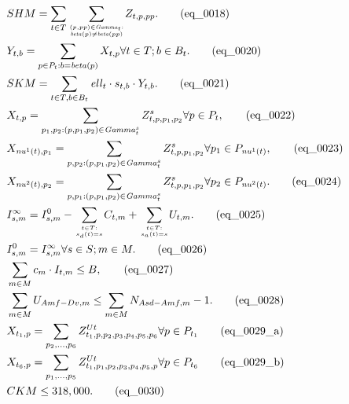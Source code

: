 \begin{align}
  & SHM = \sum_{t \in T} \underset{\genfrac{}{}{0pt}{}{\left(p , pp\right) \in \mathit{Gamma}_{t} :}{\mathit{beta} \left(p\right) \neq \mathit{beta} \left(pp\right)}}{\sum} Z_{t , p , pp} . \tag{eq\_0018} \\
  & Y_{t , b} = \sum_{p \in P_{t} : b = \mathit{beta} \left(p\right)} X_{t , p} \forall t \in T ; b \in B_{t} . \tag{eq\_0020} \\
  & SKM = \sum_{t \in T, b \in B_{t}} \mathit{ell}_{t} \cdot s_{t , b} \cdot Y_{t , b} . \tag{eq\_0021} \\
  & X_{t , p} = \sum_{p_{1} , p_{2} : \left(p , p_{1} , p_{2}\right) \in \mathit{Gamma}_{t}^{s}} Z_{t , p , p_{1} , p_{2}}^{s} \forall p \in P_{t} , \tag{eq\_0022} \\
  & X_{\mathit{nu}^{1} \left(t\right) , p_{1}} = \sum_{p , p_{2} : \left(p , p_{1} , p_{2}\right) \in \mathit{Gamma}_{t}^{s}} Z_{t , p , p_{1} , p_{2}}^{s} \forall p_{1} \in P_{\mathit{nu}^{1} \left(t\right)} , \tag{eq\_0023} \\
  & X_{\mathit{nu}^{2} \left(t\right) , p_{2}} = \sum_{p , p_{1} : \left(p , p_{1} , p_{2}\right) \in \mathit{Gamma}_{t}^{s}} Z_{t , p , p_{1} , p_{2}}^{s} \forall p_{2} \in P_{\mathit{nu}^{2} \left(t\right)} . \tag{eq\_0024} \\
  & I_{s , m}^{\infty} = I_{s , m}^{0} - \underset{\genfrac{}{}{0pt}{}{t \in T :}{s_{d} \left(t\right) = s}}{\sum} C_{t , m} + \underset{\genfrac{}{}{0pt}{}{t \in T :}{s_{a} \left(t\right) = s}}{\sum} U_{t , m} . \tag{eq\_0025} \\
  & I_{s , m}^{0} = I_{s , m}^{\infty} \forall s \in S ; m \in M . \tag{eq\_0026} \\
  & \sum_{m \in M} c_{m} \cdot I_{t , m} \leq B , \tag{eq\_0027} \\
  & \sum_{m \in M} U_{Amf - Dv , m} \leq \sum_{m \in M} N_{Asd - Amf , m} - 1 . \tag{eq\_0028} \\
  & X_{t_1,p} = \sum_{p_2,\ldots,p_6} Z_{t_1,p,p_2,p_3,p_4,p_5,p_6}^{Ut} \forall p \in P_{t_1} \tag{eq\_0029\_a} \\
  & X_{t_6,p} = \sum_{p_1,\ldots,p_5} Z_{t_1,p_1,p_2,p_3,p_4,p_5,p}^{Ut} \forall p \in P_{t_6} \tag{eq\_0029\_b} \\
  & CKM \leq 318 , 000 . \tag{eq\_0030} \\
\end{align}

